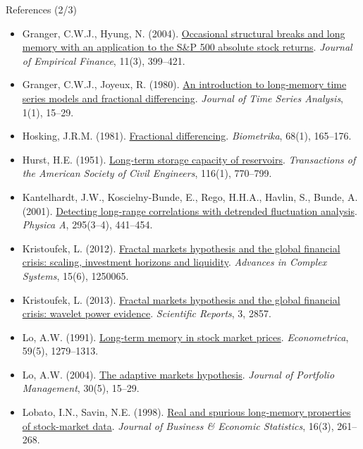 \begin{frame}{References (2/3)}
\itemsize{\tiny}
\begin{itemize}
    \item Granger, C.W.J., Hyung, N. (2004). \href{https://doi.org/10.1016/j.jempfin.2003.03.001}{Occasional structural breaks and long memory with an application to the S\&P 500 absolute stock returns}. \textit{Journal of Empirical Finance}, 11(3), 399--421.
    \item Granger, C.W.J., Joyeux, R. (1980). \href{https://doi.org/10.1111/j.1467-9892.1980.tb00297.x}{An introduction to long-memory time series models and fractional differencing}. \textit{Journal of Time Series Analysis}, 1(1), 15--29.
    \item Hosking, J.R.M. (1981). \href{https://doi.org/10.1093/biomet/68.1.165}{Fractional differencing}. \textit{Biometrika}, 68(1), 165--176.
    \item Hurst, H.E. (1951). \href{https://doi.org/10.1061/TACEAT.0006518}{Long-term storage capacity of reservoirs}. \textit{Transactions of the American Society of Civil Engineers}, 116(1), 770--799.
    \item Kantelhardt, J.W., Koscielny-Bunde, E., Rego, H.H.A., Havlin, S., Bunde, A. (2001). \href{https://doi.org/10.1016/S0378-4371(01)00144-3}{Detecting long-range correlations with detrended fluctuation analysis}. \textit{Physica A}, 295(3--4), 441--454.
    \item Kristoufek, L. (2012). \href{https://doi.org/10.1142/S0219525912500658}{Fractal markets hypothesis and the global financial crisis: scaling, investment horizons and liquidity}. \textit{Advances in Complex Systems}, 15(6), 1250065.
    \item Kristoufek, L. (2013). \href{https://doi.org/10.1038/srep02857}{Fractal markets hypothesis and the global financial crisis: wavelet power evidence}. \textit{Scientific Reports}, 3, 2857.
    \item Lo, A.W. (1991). \href{https://doi.org/10.2307/2938368}{Long-term memory in stock market prices}. \textit{Econometrica}, 59(5), 1279--1313.
    \item Lo, A.W. (2004). \href{https://doi.org/10.3905/jpm.2004.442611}{The adaptive markets hypothesis}. \textit{Journal of Portfolio Management}, 30(5), 15--29.
    \item Lobato, I.N., Savin, N.E. (1998). \href{https://doi.org/10.1080/07350015.1998.10524760}{Real and spurious long-memory properties of stock-market data}. \textit{Journal of Business \& Economic Statistics}, 16(3), 261--268.

\end{itemize}
\end{frame}
